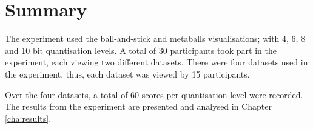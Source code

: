 
\section{Summary}
\label{sec:experiment_summary}

The experiment used the ball-and-stick and metaballs visualisations; with 4, 6,
8 and 10 bit quantisation levels. A total of 30 participants took part in the
experiment, each viewing two different datasets. There were four datasets used
in the experiment, thus, each dataset was viewed by 15 participants.

Over the four datasets, a total of 60 scores per quantisation level were
recorded. The results from the experiment are presented and analysed in Chapter
\ref{cha:results}.



